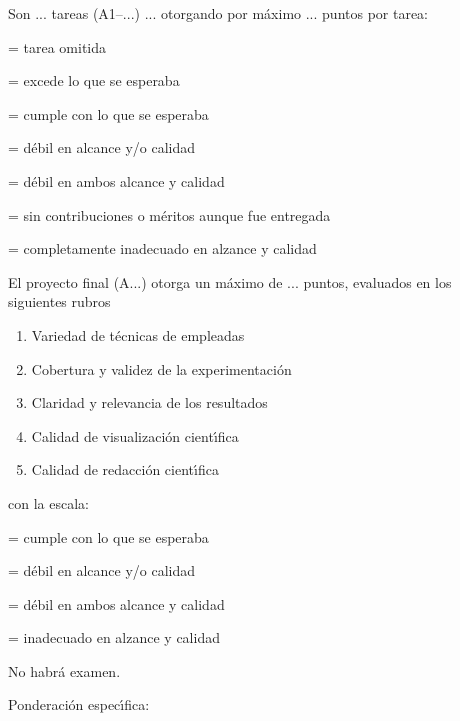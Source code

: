 \documentclass[10 pt]{article}
\begin{document}
  Son ... tareas (A1--...) ... otorgando por m\'{a}ximo ... puntos por tarea:
  \begin{description}[itemsep=0em]
  \item[NP]{= tarea omitida}
  \item[5]{= excede lo que se esperaba}
  \item[4]{= cumple con lo que se esperaba}
  \item[3]{= d\'{e}bil en alcance y/o calidad}
  \item[2]{= d\'{e}bil en ambos alcance y calidad}
  \item[1]{= sin contribuciones o m\'{e}ritos aunque fue entregada}
  \item[0]{= completamente inadecuado en alzance y calidad}
  \end{description}
  El proyecto final (A...) otorga un m\'{a}ximo de ... puntos, evaluados en los
  siguientes rubros
  \begin{enumerate}[itemsep=0em]
  \item{Variedad de t\'{e}cnicas de empleadas}
  \item{Cobertura y validez de la experimentaci\'{o}n}
  \item{Claridad y relevancia de los resultados}    
  \item{Calidad de visualizaci\'{o}n cient\'{\i}fica}
  \item{Calidad de redacci\'{o}n cient\'{\i}fica}
  \end{enumerate}
  con la escala:
  \begin{description}[itemsep=0em]
  \item[3]{= cumple con lo que se esperaba}
  \item[2]{= d\'{e}bil en alcance y/o calidad}
  \item[1]{= d\'{e}bil en ambos alcance y calidad}
  \item[0]{= inadecuado en alzance y calidad}
  \end{description}


  No habr\'{a} examen. %

  
  Ponderaci\'{o}n espec\'{\i}fica:
\end{document}

